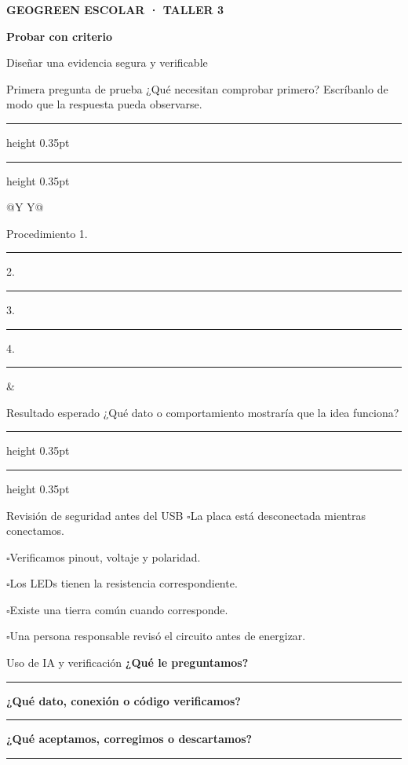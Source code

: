 \documentclass[10pt,a4paper]{article}
\newcommand{\writearea}[1]{\vspace{#1}\hrule height 0.35pt\vspace{4mm}\hrule height 0.35pt}
\newcommand{\checkline}[1]{$\square$\hspace{1.5mm}#1}
\newcommand{\pagehead}[2]{%
  {\small\bfseries\textcolor{AIEPRed}{GEOGREEN ESCOLAR · TALLER 3}}\par
  \vspace{2mm}
  {\LARGE\bfseries\color{AIEPNavy}#1\par}
  {\normalsize\color{AIEPMuted}#2\par}
  \vspace{4mm}
}
\begin{document}
\newpage
\pagehead{Probar con criterio}{Diseñar una evidencia segura y verificable}

\begin{fieldbox}[height=48mm]{Primera pregunta de prueba}
¿Qué necesitan comprobar primero? Escríbanlo de modo que la respuesta pueda observarse.
\writearea{18mm}
\end{fieldbox}

\begin{tabularx}{\textwidth}{@{}Y Y@{}}
\begin{fieldbox}[height=62mm]{Procedimiento}
1. \rule{63mm}{0.35pt}\vspace{7mm}\par
2. \rule{63mm}{0.35pt}\vspace{7mm}\par
3. \rule{63mm}{0.35pt}\vspace{7mm}\par
4. \rule{63mm}{0.35pt}
\end{fieldbox}
&
\begin{fieldbox}[height=62mm]{Resultado esperado}
¿Qué dato o comportamiento mostraría que la idea funciona?
\writearea{25mm}
\end{fieldbox}
\end{tabularx}

\begin{accentfield}{Revisión de seguridad antes del USB}
\checkline{La placa está desconectada mientras conectamos.}\par
\checkline{Verificamos pinout, voltaje y polaridad.}\par
\checkline{Los LEDs tienen la resistencia correspondiente.}\par
\checkline{Existe una tierra común cuando corresponde.}\par
\checkline{Una persona responsable revisó el circuito antes de energizar.}
\end{accentfield}

\begin{fieldbox}[height=51mm]{Uso de IA y verificación}
\textbf{¿Qué le preguntamos?}\par\vspace{6mm}\hrule
\vspace{5mm}
\textbf{¿Qué dato, conexión o código verificamos?}\par\vspace{6mm}\hrule
\vspace{5mm}
\textbf{¿Qué aceptamos, corregimos o descartamos?}\par\vspace{6mm}\hrule
\end{fieldbox}
\end{document}
